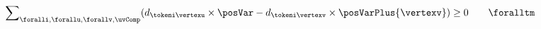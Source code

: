 \begin{align}
\sum\nolimits_{\foralli,\forallu,\forallv, \uvComp} (d_{\tokeni\vertexu} 
\times \posVar - d_{\tokeni\vertexv} \times \posVarPlus{\vertexv}) \geq 0 
\qquad & \foralltm \label{equ:plc-sum}
\end{align}
